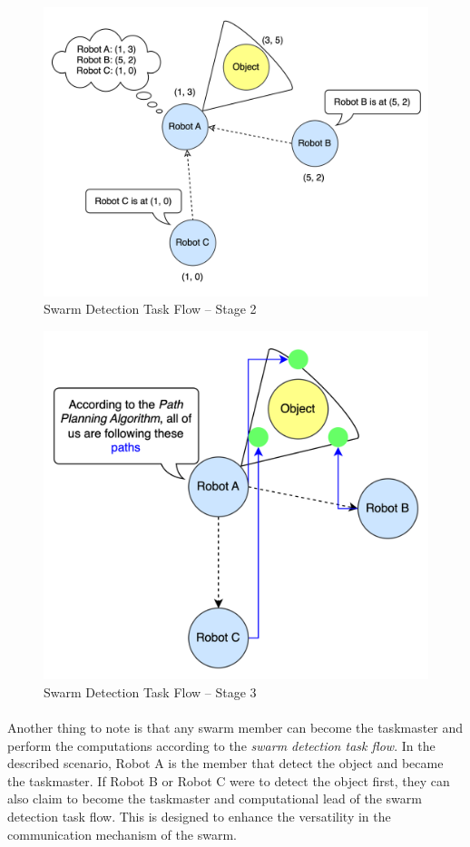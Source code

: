 \begin{figure} [H]
    \centering
    \includegraphics[width=0.6\linewidth]{assets/images/communication/swarm-detection-task-flow-2.png}
    \caption{Swarm Detection Task Flow -- Stage 2}
    \label{fig:swarm-detection-task-2}
\end{figure}

\begin{figure} [H]
    \centering
    \includegraphics[width=0.6\linewidth]{assets/images/communication/swarm-detection-task-flow-3.png}
    \caption{Swarm Detection Task Flow -- Stage 3}
    \label{fig:swarm-detection-task-3}
\end{figure}

\paragraph*{}
Another thing to note is that any swarm member can become the taskmaster and perform the computations according to the \textit{swarm detection task flow}. In the described scenario, Robot A is the member that detect the object and became the taskmaster. If Robot B or Robot C were to detect the object first, they can also claim to become the taskmaster and computational lead of the swarm detection task flow. This is designed to enhance the versatility in the communication mechanism of the swarm. 

